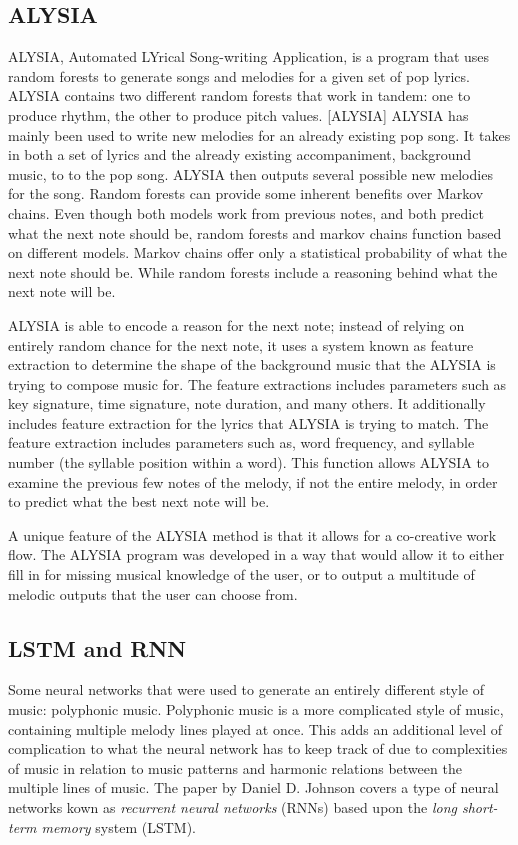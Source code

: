 \documentclass{sig-alternate}
\begin{document}
\subsection{ALYSIA}
\label{sec:ALYSIA}
	ALYSIA, Automated LYrical Song-writing Application, is a program that uses random forests to generate songs and melodies for a given set of pop lyrics. ALYSIA contains two different random forests that work in tandem: one to produce rhythm, the other to produce pitch values. [ALYSIA] ALYSIA has mainly been used to write new melodies for an already existing pop song. It takes in both a set of lyrics and the already existing accompaniment, background music,  to to the pop song. ALYSIA then outputs several possible new melodies for the song. Random forests can provide some inherent benefits over Markov chains. Even though both models work from previous notes, and both predict what the next note should be, random forests and markov chains function based on different models. Markov chains offer only a statistical probability of what the next note should be. While random forests include a reasoning behind what the next note will be.
	
	ALYSIA is able to encode a reason for the next note; instead of relying on entirely random chance for the next note, it uses a system known as feature extraction to determine the shape of the background music that the ALYSIA is trying to compose music for. The feature extractions includes parameters such as key signature, time signature, note duration, and many others. It additionally includes feature extraction for the lyrics that ALYSIA is trying to match. The feature extraction includes parameters such as, word frequency, and syllable number (the syllable position within a word). This function allows ALYSIA to examine the previous few notes of the melody, if not the entire melody, in order to predict what the best next note will be.

	A unique feature of the ALYSIA method is that it allows for a co-creative work flow. The ALYSIA program was developed in a way that would allow it to either fill in for missing musical knowledge of the user, or to output a multitude of melodic outputs that the user can choose from.

\subsection{LSTM and RNN}
\label{sec:lstm}
 	Some neural networks that were used to generate an entirely different style of music: polyphonic music. Polyphonic music is a more complicated style of music, containing multiple melody lines played at once. This adds an additional level of complication to what the neural network has to keep track of due to complexities of music in relation to music patterns and harmonic relations between the multiple lines of music. The paper by Daniel D. Johnson covers a type of neural networks kown as \textit{recurrent neural networks} (RNNs) based upon the \textit{long short-term memory} system (LSTM).
\end{document}
